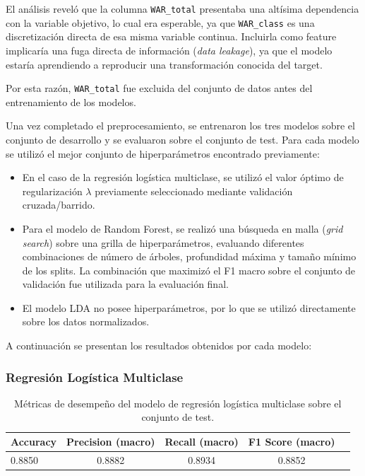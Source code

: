 \documentclass[11pt]{article}
\begin{document}
El análisis reveló que la columna \texttt{WAR\_total} presentaba una altísima dependencia con la variable objetivo, lo cual era esperable, ya que \texttt{WAR\_class} es una discretización directa de esa misma variable continua. Incluirla como feature implicaría una fuga directa de información (\textit{data leakage}), ya que el modelo estaría aprendiendo a reproducir una transformación conocida del target.

Por esta razón, \texttt{WAR\_total} fue excluida del conjunto de datos antes del entrenamiento de los modelos.

Una vez completado el preprocesamiento, se entrenaron los tres modelos sobre el conjunto de desarrollo y se evaluaron sobre el conjunto de test. Para cada modelo se utilizó el mejor conjunto de hiperparámetros encontrado previamente:

\begin{itemize}
    \item En el caso de la regresión logística multiclase, se utilizó el valor óptimo de regularización $\lambda$ previamente seleccionado mediante validación cruzada/barrido.
    \item Para el modelo de Random Forest, se realizó una búsqueda en malla (\textit{grid search}) sobre una grilla de hiperparámetros, evaluando diferentes combinaciones de número de árboles, profundidad máxima y tamaño mínimo de los splits. La combinación que maximizó el F1 macro sobre el conjunto de validación fue utilizada para la evaluación final.
    \item El modelo LDA no posee hiperparámetros, por lo que se utilizó directamente sobre los datos normalizados.
\end{itemize}

A continuación se presentan los resultados obtenidos por cada modelo:

\subsubsection*{Regresión Logística Multiclase}
\begin{table}[H]
    \centering
    \begin{tabular}{lcccc}
        \toprule
        \textbf{Accuracy} & \textbf{Precision (macro)} & \textbf{Recall (macro)} & \textbf{F1 Score (macro)} \\
        \midrule
        0.8850 & 0.8882 & 0.8934 & 0.8852 \\
        \bottomrule
    \end{tabular}
    \caption{Métricas de desempeño del modelo de regresión logística multiclase sobre el conjunto de test.}
    \label{tab:logistic_scores}
\end{table}
\end{document}
